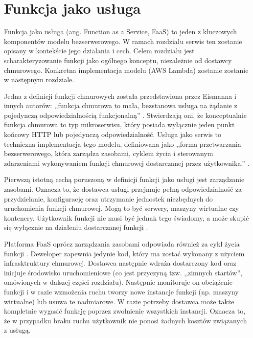 \section{Funkcja jako usługa}\label{chapter:funkcja_jako_usluga}

Funkcja jako usługa (ang. Function as a Service, FaaS) to jeden z kluczowych komponentów modelu bezserwerowego.
W ramach rozdziału serwis ten zostanie opisany w kontekście jego działania i cech.
Celem rozdziału jest scharakteryzowanie funkcji jako ogólnego konceptu, niezależnie od dostawcy chmurowego.
Konkretna implementacja modelu (AWS Lambda) zostanie zostanie w następnym rozdziale.

Jedna z definicji funkcji chmurowych została przedstawiona przez Eismanna i innych autorów: ,,funkcja chmurowa to mała, bezstanowa usługa na żądanie z pojedynczą odpowiedzialnością funkcjonalną'' \cite{SpecRgCloudGroupVisionOnThePerformanceChallengesOfFaas}.
Stwierdzają oni, że konceptualnie funkcja chmurowa to typ mikroserwisu, który posiada wyłącznie jeden punkt końcowy HTTP lub pojedynczą odpowiedzialność.
Usługa jako serwis to techniczna implementacja tego modelu, definiowana jako ,,forma przetwarzania bezserwerowego, która zarządza zasobami, cyklem życia i sterowanym zdarzeniami wykonywaniem funkcji chmurowej dostarczanej przez użytkownika.'' \cite{SpecRgCloudGroupVisionOnThePerformanceChallengesOfFaas}.

Pierwszą istotną cechą poruszoną w definicji funkcji jako usługi jest zarządzanie zasobami. 
Oznacza to, że dostawca usługi przejmuje pełną odpowiedzialność za przydzielanie, konfigurację oraz utrzymanie jednostek niezbędnych do uruchomienia funkcji chmurowej.
Mogą to być serwery, maszyny wirtualne czy kontenery.
Użytkownik funkcji nie musi być jednak tego świadomy, a może skupić się wyłącznie na działeniu dostarczanej funkcji \cite{eismann2021reviewserverlessusecases}.

Platforma FaaS oprócz zarządzania zasobami odpowiada również za cykl życia funkcji \cite{ServerlessIsMoreFromPaaSToPresentCloudComputing}. 
Deweloper zapewnia jedynie kod, który ma zostać wykonany z użyciem infrasktruktury chmurowej.
Dostawca następnie wdraża dostarczony kod oraz inicjuje środowisko uruchomieniowe (co jest przyczyną tzw. ,,zimnych startów'', omówionych w dalszej części rozdziału).
Następnie monitoruje on obciążenie funkcji i w razie wzmożenia ruchu tworzy nowe instancje funkcji (np. maszyny wirtualne) lub usuwa te nadmiarowe. 
W razie potrzeby dostawca może także kompletnie wygasić funkcję poprzez zwolnienie wszystkich instancji.
Oznacza to, że w przypadku braku ruchu użytkownik nie ponosi żadnych kosztów związanych z usługą.

